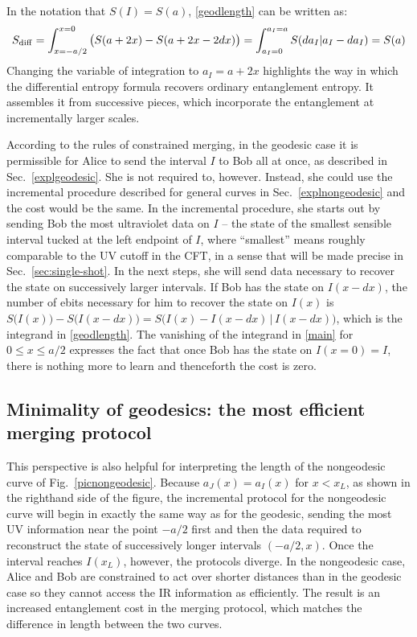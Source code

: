\documentclass[12pt]{article}
\def\sdiff{S_{\rm diff}}
\newcommand{\figref}[1]{Fig.~\ref{#1}}
\newcommand{\secref}[1]{Sec.~\ref{#1}}
\begin{document}
In the notation that $S(I) = S(a)$, \eqref{geodlength} can be written as:
\begin{equation}
\sdiff = \int_{x = -a/2}^{x=0} \big(S(a+2x) - S(a+2x -2dx) \big)= \int_{a_I = 0}^{a_I = a} S(da_I | a_I - da_I) = S(a)
\label{geodbyscale}
\end{equation}
Changing the variable of integration to $a_I = a+2x$ highlights the way in which the differential entropy formula recovers ordinary entanglement entropy. It assembles it from successive pieces, which incorporate the entanglement at incrementally larger scales.

According to the rules of constrained merging, in the geodesic case it is permissible for Alice to send the interval $I$ to Bob all at once, as described in Sec.~\ref{explgeodesic}. She is not required to, however. Instead, she could use the incremental procedure described for general curves in Sec.~\ref{explnongeodesic} and the cost would be the same.
%
In the incremental procedure, she starts out by sending Bob the most ultraviolet data on $I$ -- the state of the smallest sensible interval tucked at the left endpoint of $I$, where ``smallest'' means roughly comparable to the UV cutoff in the CFT, in a sense that will be made precise in \secref{sec:single-shot}. In the next steps, she will send data necessary to recover the state on successively larger intervals. If Bob has the state on $I(x-dx)$, the number of ebits necessary for him to recover the state on $I(x)$ is $S\big(I(x)\big) - S\big(I(x-dx)\big) = S\big(I(x) - I(x-dx) \, | \, I(x-dx)\big)$, which is the integrand in \eqref{geodlength}.  The vanishing of the integrand in \eqref{main} for $0 \leq x \leq a/2$ expresses the fact that once Bob has the state on $I(x=0) = I$, there is nothing more to learn and thenceforth the cost is zero.

\subsection{Minimality of geodesics: the most efficient merging protocol}
\label{min-geodesic}

This perspective is also helpful for interpreting the length of the nongeodesic curve of \figref{picnongeodesic}. Because $a_J(x) = a_I(x)$ for $x < x_L$, as shown in the righthand side of the figure, the incremental protocol for the nongeodesic curve will begin in exactly the same way as for the geodesic, sending the most UV information near the point $-a/2$ first and then the data required to reconstruct the state of successively longer intervals $(-a/2,x)$. Once the interval reaches $I(x_L)$, however, the protocols diverge. In the nongeodesic case, Alice and Bob are constrained to act over shorter distances than in the geodesic case so they cannot access the IR information as efficiently. The result is an increased entanglement cost in the merging protocol, which matches the difference in length between the two curves.
\end{document}
